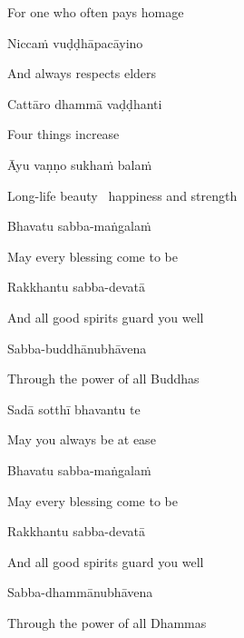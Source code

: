 \begin{english}
  For one who often pays homage
\end{english}

Niccaṁ vuḍḍhāpacāyino

\begin{english}
  And always respects elders
\end{english}

Cattāro dhammā vaḍḍhanti

\begin{english}
  Four things increase
\end{english}

Āyu vaṇṇo sukhaṁ balaṁ

\begin{english}
  Long-life beauty \breathmark\ happiness and strength
\end{english}

Bhavatu sabba-maṅgalaṁ

\begin{english}
  May every blessing come to be
\end{english}

Rakkhantu sabba-devatā

\begin{english}
  And all good spirits guard you well
\end{english}

Sabba-buddhānubhāvena

\begin{english}
  Through the power of all Buddhas
\end{english}

Sadā sotthī bhavantu te

\begin{english}
  May you always be at ease
\end{english}

Bhavatu sabba-maṅgalaṁ

\begin{english}
  May every blessing come to be
\end{english}

Rakkhantu sabba-devatā

\begin{english}
  And all good spirits guard you well
\end{english}

Sabba-dhammānubhāvena

\begin{english}
  Through the power of all Dhammas
\end{english}

